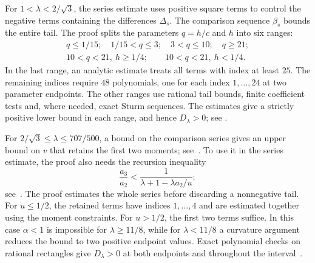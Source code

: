 For $1<\lambda<2/\sqrt3$, the series estimate uses positive square terms to control the negative terms containing the differences $\Delta_s$. The comparison sequence $\beta_s$ bounds the entire tail. The proof splits the parameters $q=h/c$ and $h$ into six ranges:
\[
 \begin{gathered}
 q\le1/15;\quad 1/15<q\le3;\quad 3<q\le10;\quad q\ge21;\\
 10<q<21,\ h\ge1/4;\qquad 10<q<21,\ h<1/4.
 \end{gathered}
\]
In the last range, an analytic estimate treats all terms with index at least $25$. The remaining indices require $48$ polynomials, one for each index $1,\ldots,24$ at two parameter endpoints. The other ranges use rational tail bounds, finite
coefficient tests and, where needed, exact Sturm sequences. The estimates give a strictly positive lower bound in each range, and hence $D_\lambda>0$;
see \cite[Lemmas~6.9--6.14 and Proposition~6.15]{FullVersion}.

For $2/\sqrt3\le\lambda\le707/500$, a bound on the comparison series gives an upper bound on $v$ that retains the first two moments; see~\cite[Lemma~6.16]{FullVersion}. To use it in the series estimate, the proof also needs the recursion inequality
\begin{equation*}
 \frac{a_3}{a_2}<\frac1{\lambda+1-\lambda a_2/u};
\end{equation*}
see~\cite[Lemma~6.17]{FullVersion}. The proof estimates the whole series before discarding a nonnegative tail. For $u\le1/2$, the retained terms have indices $1,\ldots,4$ and are estimated together using the moment constraints. For $u>1/2$, the first two terms suffice. In this case $\alpha<1$ is impossible for $\lambda\ge11/8$, while for $\lambda<11/8$ a curvature argument reduces the bound to two positive endpoint values. Exact polynomial checks on rational rectangles give $D_\lambda>0$ at both endpoints and throughout the interval~\cite[Section~6.5, especially Lemmas~6.20, 6.27 and 6.30]{FullVersion}.

\newpage
